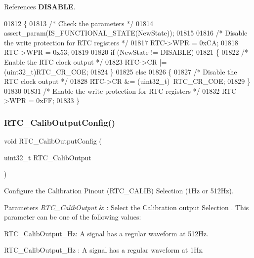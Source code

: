 References \textbf{ D\+I\+S\+A\+B\+LE}.


\begin{DoxyCode}
01812 \{
01813   \textcolor{comment}{/* Check the parameters */}
01814   assert_param(IS_FUNCTIONAL_STATE(NewState));
01815   
01816   \textcolor{comment}{/* Disable the write protection for RTC registers */}
01817   RTC->WPR = 0xCA;
01818   RTC->WPR = 0x53;
01819   
01820   \textcolor{keywordflow}{if} (NewState != DISABLE)
01821   \{
01822     \textcolor{comment}{/* Enable the RTC clock output */}
01823     RTC->CR |= (uint32\_t)RTC_CR_COE;
01824   \}
01825   \textcolor{keywordflow}{else}
01826   \{ 
01827     \textcolor{comment}{/* Disable the RTC clock output */}
01828     RTC->CR &= (uint32\_t)~RTC_CR_COE;
01829   \}
01830   
01831   \textcolor{comment}{/* Enable the write protection for RTC registers */}
01832   RTC->WPR = 0xFF; 
01833 \}
\end{DoxyCode}
\mbox{\label{group__RTC__Group7_ga2139adc802bdb6882904c0b855d50b29}} 
\subsubsection{R\+T\+C\+\_\+\+Calib\+Output\+Config()}
{\footnotesize\ttfamily void R\+T\+C\+\_\+\+Calib\+Output\+Config (\begin{DoxyParamCaption}\item[{uint32\+\_\+t}]{R\+T\+C\+\_\+\+Calib\+Output }\end{DoxyParamCaption})}



Configure the Calibration Pinout (R\+T\+C\+\_\+\+C\+A\+L\+IB) Selection (1\+Hz or 512\+Hz). 


\begin{DoxyParams}{Parameters}
{\em R\+T\+C\+\_\+\+Calib\+Output} & \+: Select the Calibration output Selection . This parameter can be one of the following values\+: \begin{DoxyItemize}
\item R\+T\+C\+\_\+\+Calib\+Output\+\_\+Hz\+: A signal has a regular waveform at 512\+Hz. \item R\+T\+C\+\_\+\+Calib\+Output\+\_\+Hz \+: A signal has a regular waveform at 1\+Hz. \end{DoxyItemize}
\\
\hline
\end{DoxyParams}

